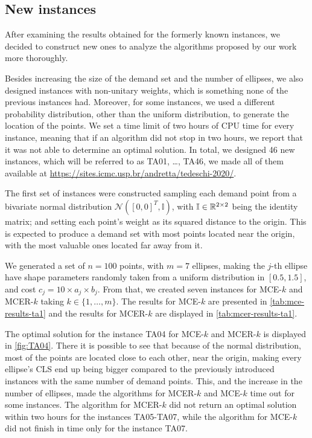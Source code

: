 \subsection{New instances}

After examining the results obtained for the formerly known instances, we decided to construct new ones to analyze the algorithms proposed by our work more thoroughly.

Besides increasing the size of the demand set and the number of ellipses, we also designed instances with non-unitary weights, which is something none of the previous instances had. 
Moreover, for some instances, we used a different probability distribution, other than the uniform distribution, to generate the location of the points.
We set a time limit of two hours of CPU time for every instance, meaning that if an algorithm did not stop in two hours, we report that it was not able to determine an optimal solution. 
In total, we designed 46 new instances, which will be referred to as TA01, \dots, TA46, we made all of them available at \url{https://sites.icmc.usp.br/andretta/tedeschi-2020/}.

The first set of instances were constructed sampling each demand point from a bivariate normal distribution $\mathcal{N}([0, 0]^T, \mathbb{I})$, with $\mathbb{I} \in \mathbb{R}^{2\times 2}$ being the identity matrix; and setting each point's weight as its squared distance to the origin. This is expected to produce a demand set with most points located near the origin, with the most valuable ones located far away from it.

We generated a set of $n=100$ points, with $m=7$ ellipses, making the $j$-th ellipse have shape parameters randomly taken from a uniform distribution in $[0.5, 1.5]$, and cost $c_j=10\times a_j \times b_j$. From that, we created seven instances for MCE-$k$ and MCER-$k$ taking $k \in \{1, \dots, m\}$. The results for MCE-$k$ are presented in \autoref{tab:mce-results-ta1} and the results for MCER-$k$ are displayed in \autoref{tab:mcer-results-ta1}.

The optimal solution for the instance TA04 for MCE-$k$ and MCER-$k$ is displayed in \autoref{fig:TA04}. There it is possible to see that because of the normal distribution, most of the points are located close to each other, near the origin, making every ellipse's CLS end up being bigger compared to the previously introduced instances with the same number of demand points. 
This, and the increase in the number of ellipses, made the algorithms for MCER-$k$ and MCE-$k$ time out for some instances. The algorithm for MCER-$k$ did not return an optimal solution within two hours for the instances TA05-TA07, while the algorithm for MCE-$k$ did not finish in time only for the instance TA07. 



